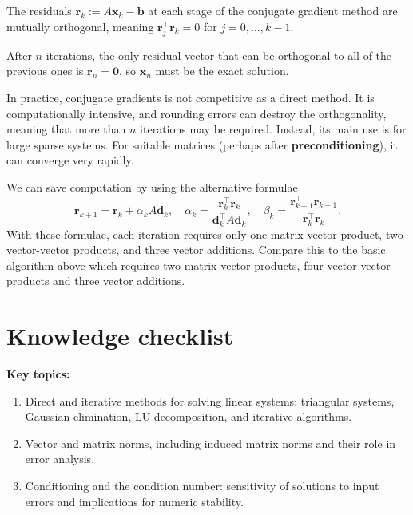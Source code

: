 \documentclass[
  letterpaper,
  DIV=11,
  numbers=noendperiod]{scrreprt}
\newenvironment{fbxSimple}[3]{\begin{tcolorbox}[enhanced, breakable,%
attach boxed title to top*={xshift=1.4pt},
boxed title style={boxrule=0.0mm, fuzzy shadow={1pt}{-1pt}{0mm}{0.1mm}{gray}, arc=.3em, rounded corners=east, sharp corners=west}, colframe=#1-color2, colbacktitle=#1-color1, colback = white, coltitle=black,  titlerule=0mm, toprule=0pt, bottomrule=.7pt, leftrule=.3em, rightrule=.7pt, outer arc=.3em,  	left=.5em, right=.5em, bottomtitle=1mm, toptitle=1mm,title=\textbf{#2}\hspace{0.5em}{#3}]}
{\end{tcolorbox}}
\begin{document}
\label{theorem-3.5}
\begin{fbxSimple}{theorem}{Theorem 3.5}{}
\label{theorem-3.5}
The residuals \(\mathbf{r}_k:=A\mathbf{x}_k - \mathbf{b}\) at each stage
of the conjugate gradient method are mutually orthogonal, meaning
\(\mathbf{r}_j^\top \mathbf{r}_k = 0\) for \(j=0,\ldots,k-1\).

\end{fbxSimple}

After \(n\) iterations, the only residual vector that can be orthogonal
to all of the previous ones is \(\mathbf{r}_n=\boldsymbol{0}\), so
\(\mathbf{x}_n\) must be the exact solution.

In practice, conjugate gradients is not competitive as a direct method.
It is computationally intensive, and rounding errors can destroy the
orthogonality, meaning that more than \(n\) iterations may be required.
Instead, its main use is for large sparse systems. For suitable matrices
(perhaps after \textbf{preconditioning}), it can converge very rapidly.

We can save computation by using the alternative formulae \[
\mathbf{r}_{k+1} = \mathbf{r}_k + \alpha_k A\mathbf{d}_k, \quad
\alpha_k = \frac{\mathbf{r}_k^\top \mathbf{r}_k}{\mathbf{d}_k^\top A \mathbf{d}_k}, \quad
\beta_k = \frac{\mathbf{r}_{k+1}^\top\mathbf{r}_{k+1}}{\mathbf{r}_k^\top\mathbf{r}_k}.
\] With these formulae, each iteration requires only one matrix-vector
product, two vector-vector products, and three vector additions. Compare
this to the basic algorithm above which requires two matrix-vector
products, four vector-vector products and three vector additions.

\section*{Knowledge checklist}\label{knowledge-checklist-2}


\textbf{Key topics:}

\begin{enumerate}
\def\labelenumi{\arabic{enumi}.}
\item
  Direct and iterative methods for solving linear systems: triangular
  systems, Gaussian elimination, LU decomposition, and iterative
  algorithms.
\item
  Vector and matrix norms, including induced matrix norms and their role
  in error analysis.
\item
  Conditioning and the condition number: sensitivity of solutions to
  input errors and implications for numeric stability.
\end{enumerate}
\end{document}
